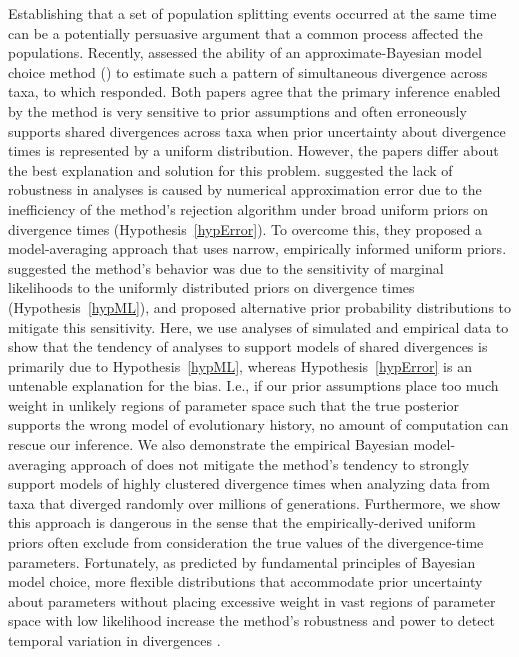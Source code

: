 Establishing that a set of population splitting events occurred at the same
time can be a potentially persuasive argument that a common process affected
the populations.
Recently, \citet{Oaks2012} assessed the ability of an approximate-Bayesian
model choice method (\msb) to estimate such a pattern of simultaneous
divergence across taxa, to which \citet{Hickerson2013} responded.
Both papers agree that the primary inference enabled by the method is very
sensitive to prior assumptions and often erroneously supports shared
divergences across taxa when prior uncertainty about divergence times
is represented by a uniform distribution.
However, the papers differ about the best explanation and solution for this
problem.
\citet{Hickerson2013} suggested the lack of robustness in \msb analyses is
caused by numerical approximation error due to the inefficiency of the method's
rejection algorithm under broad uniform priors on divergence times
(Hypothesis~\ref{hypError}).
To overcome this, they proposed a model-averaging approach that uses narrow,
empirically informed uniform priors.
\citet{Oaks2012} suggested the method's behavior was due to the sensitivity of
marginal likelihoods to the uniformly distributed priors on divergence times
(Hypothesis~\ref{hypML}), and proposed alternative prior probability
distributions to mitigate this sensitivity.
Here, we use analyses of simulated and empirical data to show that the tendency
of \msb analyses to support models of shared divergences is primarily due to
Hypothesis~\ref{hypML}, whereas Hypothesis~\ref{hypError} is an untenable
explanation for the bias.
I.e., if our prior assumptions place too much weight in unlikely regions of
parameter space such that the true posterior supports the wrong model of
evolutionary history, no amount of computation can rescue our inference. 
We also demonstrate the empirical Bayesian model-averaging approach of
\citet{Hickerson2013} does not mitigate the method's tendency to strongly
support models of highly clustered divergence times when analyzing data from
taxa that diverged randomly over millions of generations.
Furthermore, we show this approach is dangerous in the sense that the
empirically-derived uniform priors often exclude from consideration the true
values of the divergence-time parameters.
Fortunately, as predicted by fundamental principles of Bayesian model choice,
more flexible distributions that accommodate prior uncertainty about parameters
without placing excessive weight in vast regions of parameter space with low
likelihood increase the method's robustness and power to detect temporal
variation in divergences \citep{Oaks2014dpp}.
